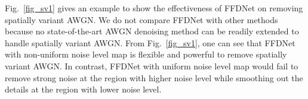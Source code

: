 \documentclass[journal]{IEEEtran}
\begin{document}
Fig.~\ref{fig_sv1} gives an example to show the effectiveness of FFDNet on removing spatially variant AWGN. We do not compare FFDNet with other methods because no state-of-the-art AWGN denoising method can be readily extended to handle spatially variant AWGN. From Fig.~\ref{fig_sv1}, one can see that FFDNet with non-uniform noise level map is flexible and powerful to remove spatially variant AWGN.
In contrast, FFDNet with uniform noise level map would fail to remove strong noise at the region with higher noise level while smoothing out the details at the region with lower noise level.


\begin{figure}[!htbp]
\setlength{\abovecaptionskip}{0pt}
\setlength{\belowcaptionskip}{0pt}
\centering
{}
\end{figure}
\end{document}
